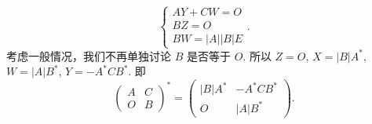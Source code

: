 \begin{exercise}
\begin{exgroup}
\begin{answer}
\begin{enumerate}
\[\begin{cases}
                              AY+CW = O                                 \\
                              BZ    = O                                 \\
                              BW    = \lvert A \rvert \lvert B \rvert E
                          \end{cases}.\]
                      考虑一般情况，我们不再单独讨论 $B$ 是否等于 $O$. 所以 $Z = O$, $X = \lvert B \rvert A^*$, $W = \lvert A \rvert B^*$, $Y = -A^*CB^*$. 即 \[\begin{pmatrix}
                              A & C \\
                              O & B
                          \end{pmatrix}^* = \begin{pmatrix}
                              \lvert B \rvert A^* & -A^*CB^*            \\
                              O                   & \lvert A \rvert B^*
                          \end{pmatrix}.\]


\end{enumerate}
\end{answer}
\end{exgroup}
\end{exercise}
